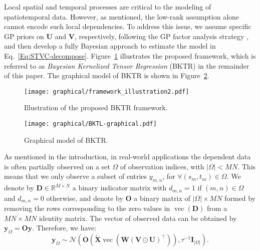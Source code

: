 \documentclass[12pt]{article}
\newcommand{\bd}[1]{\boldsymbol{#1}}
\begin{document}
Local spatial and temporal processes are critical to the modeling of spatiotemporal data. However, as mentioned, the low-rank assumption alone cannot encode such local dependencies. To address this issue, we assume specific GP priors on $\bd{U}$ and $\bd{V}$, respectively, following the GP factor analysis strategy \citep{luttinen2009variational}, and then develop a fully Bayesian approach to estimate the model in Eq.~\eqref{Eq:STVC-decompose}. Figure~\ref{fig:illustration-BKTL} illustrates the proposed framework, which is referred to as \textit{Bayesian Kernelized Tensor Regression} (BKTR) in the remainder of this paper. The graphical model of BKTR is shown in Figure~\ref{fig:graphical-BKTL}.

\begin{figure}[!t]
\centering
\texttt{[image: graphical/framework\_illustration2.pdf]}
\caption{Illustration of the proposed BKTR framework.}
\label{fig:illustration-BKTL}
\end{figure}


\begin{figure}[!t]
\centering
\texttt{[image: graphical/BKTL-graphical.pdf]}
\caption{Graphical model of BKTR.}
\label{fig:graphical-BKTL}
\end{figure}



As mentioned in the introduction, in real-world applications the dependent data is often partially observed on a set $\Omega$ of observation indices, with $|\Omega|< MN$. This means that we only observe a subset of entries $y_{m,n}$, for $\forall(s_m,t_m) \in \Omega$.
We denote by  $\boldsymbol{D}\in\mathbb{R}^{M\times N}$ a binary indicator matrix with $d_{m,n}=1$ if $(m,n)\in\Omega$ and $d_{m,n}=0$ otherwise, and denote by $\boldsymbol{O}$ a  binary matrix of $|\Omega|\times MN$ formed by removing the rows corresponding to the zero values in $\operatorname{vec}(\boldsymbol{D})$ from a $MN\times MN$ identity matrix. The vector of observed data can be obtained by
$\boldsymbol{y}_{\Omega}=\boldsymbol{O}\boldsymbol{y}$. Therefore, we have:
\begin{equation} \label{eq:y_omega}
    \boldsymbol{y}_{\Omega}\sim\mathcal{N}\left(\boldsymbol{O}\left(\tilde{\bd{X}}\operatorname{vec}\left(\boldsymbol{W}(\boldsymbol{V}\odot\boldsymbol{U})^{\top}\right)\right),\tau^{-1}\boldsymbol{I}_{|\Omega|}\right).
\end{equation}
\end{document}
